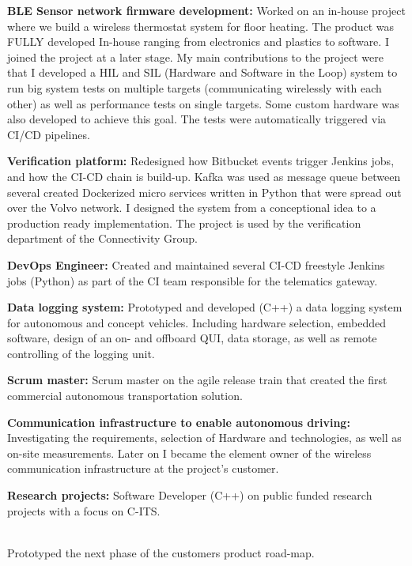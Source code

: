 \textbf{BLE Sensor network firmware development:} Worked on an in-house project where we build a wireless thermostat system for floor heating. The product was FULLY developed In-house ranging from electronics and plastics to software. I joined the project at a later stage. My main contributions to the project were that I developed a HIL and SIL (Hardware and Software in the Loop) system to run big system tests on multiple targets (communicating wirelessly with each other) as well as performance tests on single targets. Some custom hardware was also developed to achieve this goal. The tests were automatically triggered via CI/CD pipelines. \\ 
\Sep


\SmallSep
\textbf{Verification platform:} Redesigned how Bitbucket events trigger Jenkins jobs, and how the CI-CD chain is build-up. Kafka was used as message queue between several created Dockerized micro services written in Python that were spread out over the Volvo network. I designed the system from a conceptional idea to a production ready implementation. The project is used by the verification department of the Connectivity Group.
\SmallSep

\textbf{DevOps Engineer:} Created and maintained several CI-CD freestyle Jenkins jobs (Python) as part of the CI team responsible for the telematics gateway.
\SmallSep

\textbf{Data logging system:} Prototyped and developed (C++) a data logging system for autonomous and concept vehicles. Including hardware selection, embedded software, design of an on- and offboard QUI, data storage, as well as remote controlling of the logging unit. 
\SmallSep

\textbf{Scrum master:} Scrum master on the agile release train that created the first commercial autonomous transportation solution.
\SmallSep

\textbf{Communication infrastructure to enable autonomous driving:} Investigating the requirements, selection of Hardware and technologies, as well as on-site measurements. Later on I became the element owner of the wireless communication infrastructure at the project's customer.  
\SmallSep

\textbf{Research projects:} Software Developer (C++) on public funded research projects with a focus on C-ITS. \\
\Sep

 \\
Prototyped the next phase of the customers product road-map.